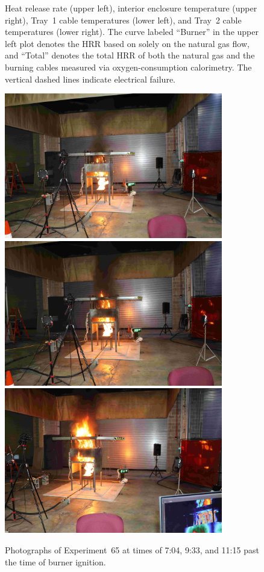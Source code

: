 \begin{figure}[H]
\caption[HRR and temperatures of Experiment 65]{Heat release rate (upper left), interior enclosure temperature (upper right), Tray~1 cable temperatures (lower left), and Tray~2 cable temperatures (lower right). The curve labeled ``Burner'' in the upper left plot denotes the HRR based on solely on the natural gas flow, and ``Total'' denotes the total HRR of both the natural gas and the burning cables measured via oxygen-consumption calorimetry. The vertical dashed lines indicate electrical failure.}
\label{fig:Test_65}
\end{figure}

\begin{figure}[p]
\centering
\includegraphics[height=2.50in]{../FIGURES/Test_65_Photo_1} \\ \vspace{0.1in}
\includegraphics[height=2.50in]{../FIGURES/Test_65_Photo_2} \\ \vspace{0.1in}
\includegraphics[height=2.50in]{../FIGURES/Test_65_Photo_3}
\caption[Photographs of Experiment~65]{Photographs of Experiment~65 at times of 7:04, 9:33, and 11:15 past the time of burner ignition.}
\label{fig:Test_65_photos}
\end{figure}



